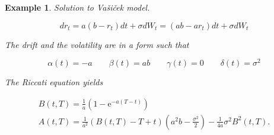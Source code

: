 \documentclass[oneside,titlepage,headinclude,12pt,a4paper,BCOR5mm,footinclude]{book}
\theoremstyle{defn}
\newtheorem{example}{Example}
\newcommand{\eexp}{\mathrm{e}}
\begin{document}
\begin{example} Solution to Va\v{s}i\v{c}ek model.

  \[
    dr_t = a(b - r_t)dt + \sigma dW_t = (ab - ar_t)dt + \sigma dW_t
  \]

  The drift and the volatility are in a form such that

  \[
    \alpha(t) = -a \quad\quad \beta(t) = ab \quad\quad \gamma(t) = 0 \quad\quad \delta(t) = \sigma^2
  \]

  The Riccati equation yields

  \begin{gather*}
    B(t,T) = \frac{1}{a}\left( 1 - \eexp^{-a(T-t)}\right)\\
    A(t,T) = \frac{1}{a^2}\left( B(t,T)-T+t\right)\left(a^2b-\frac{\sigma^2}{2}\right) -\frac{1}{4a}\sigma^2B^2(t,T).
  \end{gather*}

\end{example}
\end{document}
